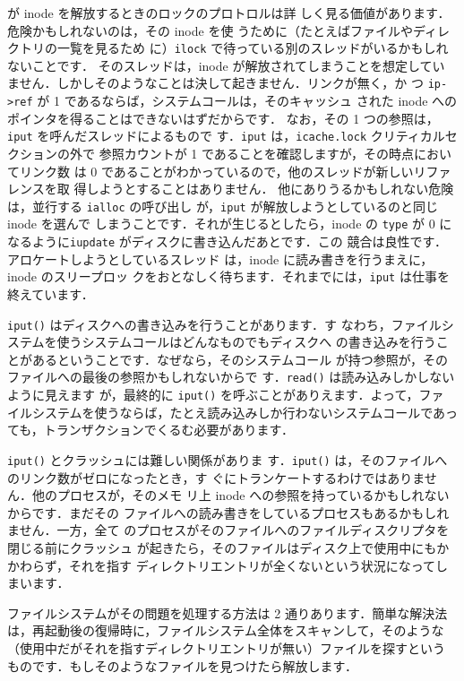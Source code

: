  が inode を解放するときのロックのプロトロルは詳
しく見る価値があります．危険かもしれないのは，その inode を使
うために（たとえばファイルやディレクトリの一覧を見るため
に）\texttt{ilock} で待っている別のスレッドがいるかもしれないことです．
そのスレッドは，inode が解放されてしまうことを想定してい
ません．しかしそのようなことは決して起きません．リンクが無く，か
つ \texttt{ip->ref} が 1 であるならば，システムコールは，そのキャッシュ
された inode へのポインタを得ることはできないはずだからです．
なお，その 1 つの参照は，\texttt{iput} を呼んだスレッドによるもので
す．\texttt{iput} は，\texttt{icache.lock} クリティカルセクションの外で
参照カウントが 1 であることを確認しますが，その時点においてリンク数
は 0 であることがわかっているので，他のスレッドが新しいリファレンスを取
得しようとすることはありません．
%
他にありうるかもしれない危険は，並行する \texttt{ialloc} の呼び出し
が，\texttt{iput} が解放しようとしているのと同じinode を選んで
しまうことです．それが生じるとしたら，inode の \texttt{type}
が 0 になるように\texttt{iupdate} がディスクに書き込んだあとです．この
競合は良性です．アロケートしようとしているスレッド
は，inode に読み書きを行うまえに，inode のスリープロッ
クをおとなしく待ちます．それまでには，\texttt{iput} は仕事を終えています．

\texttt{iput()} はディスクへの書き込みを行うことがあります．す
なわち，ファイルシステムを使うシステムコールはどんなものでもディスクへ
の書き込みを行うことがあるということです．なぜなら，そのシステムコール
が持つ参照が，そのファイルへの最後の参照かもしれないからで
す．\texttt{read()} は読み込みしかしないように見えます
が，最終的に \texttt{iput()} を呼ぶことがありえます．よって，ファ
イルシステムを使うならば，たとえ読み込みしか行わないシステムコールであっ
ても，トランザクションでくるむ必要があります．

\texttt{iput()} とクラッシュには難しい関係がありま
す．\texttt{iput()} は，そのファイルへのリンク数がゼロになったとき，す
ぐにトランケートするわけではありません．他のプロセスが，そのメモ
リ上 inode への参照を持っているかもしれないからです．まだその
ファイルへの読み書きをしているプロセスもあるかもしれません．一方，全て
のプロセスがそのファイルへのファイルディスクリプタを閉じる前にクラッシュ
が起きたら，そのファイルはディスク上で使用中にもかかわらず，それを指す
ディレクトリエントリが全くないという状況になってしまいます．

ファイルシステムがその問題を処理する方法は 2 通りあります．簡単な解決法
は，再起動後の復帰時に，ファイルシステム全体をスキャンして，そのような
（使用中だがそれを指すディレクトリエントリが無い）ファイルを探すという
ものです．もしそのようなファイルを見つけたら解放します．

